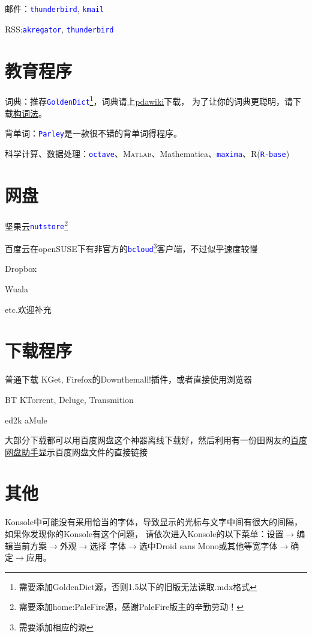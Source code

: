 \documentclass[11pt]{article}
\newcommand{\soft}[1]{\texttt{\textcolor{blue}{#1}}}
\begin{document}
邮件：\soft{thunderbird}, \soft{kmail}

RSS:\soft{akregator}, \soft{thunderbird}
\section{教育程序}
词典：推荐\soft{GoldenDict}\footnote{需要添加GoldenDict源，否则1.5以下的旧版无法读取.mdx格式}，词典请上\href{http://pdawiki.com/forum/forum.php}{pdawiki}下载，
为了让你的词典更聪明，请下载\href{https://zpj.blog.ustc.edu.cn/wp-content/uploads/2014/02/wordsrule.tar.gz}{构词法}。

背单词：\soft{Parley}是一款很不错的背单词得程序。

科学计算、数据处理：\soft{octave}、\textsc{Matlab}、Mathematica、\soft{maxima}、R(\soft{R-base})
\section{网盘}
\begin{compactitem}
 \item 坚果云\soft{nutstore}\footnote{需要添加home:PaleFire源，感谢PaleFire版主的辛勤劳动！}
 \item 百度云在openSUSE下有非官方的\soft{bcloud}\footnote{需要添加相应的源}客户端，不过似乎速度较慢
 \item Dropbox
 \item Wuala
 \item etc.欢迎补充
\end{compactitem}
\section{下载程序}
\begin{compactdesc}
 \item[普通下载] KGet, Firefox的Down\-them\-all!插件，或者直接使用浏览器
 \item[BT] KTorrent, Deluge, Transmition
 \item[ed2k] aMule
\end{compactdesc}

大部分下载都可以用百度网盘这个神器离线下载好，然后利用有一份田网友的\href{http://git.oschina.net/youyifentian/dupanlink}{百度网盘助手}显示百度网盘文件的直接链接
\section{其他}
Konsole中可能没有采用恰当的字体，导致显示的光标与文字中间有很大的间隔，如果你发现你的Konsole有这个问题，
请依次进入Konsole的以下菜单：设置$\rightarrow$编辑当前方案$\rightarrow$外观$\rightarrow$选择
字体$\rightarrow$选中Droid sans Mono或其他等宽字体$\rightarrow$确定$\rightarrow$应用。
\end{document}
